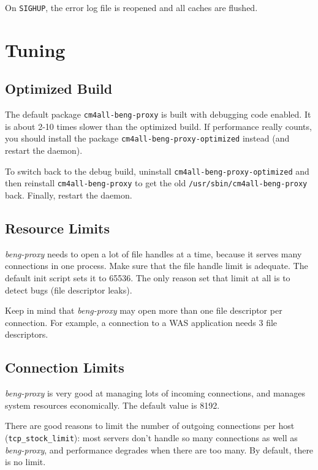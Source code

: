 \documentclass[a4paper,12pt]{article}
\begin{document}
On \texttt{SIGHUP}, the error log file is reopened and all caches are
flushed.


\section{Tuning}

\subsection{Optimized Build}

The default package \texttt{cm4all-beng-proxy} is built with debugging
code enabled.  It is about 2-10 times slower than the optimized build.
If performance really counts, you should install the package
\texttt{cm4all\--beng\--proxy\--optimized} instead (and restart the
daemon).

To switch back to the debug build, uninstall
\texttt{cm4all\--beng\--proxy\--op\-ti\-mi\-zed} and then reinstall
\texttt{cm4all\--beng\--proxy} to get the old
\texttt{/usr/sbin/cm4all\--beng\--proxy} back.  Finally, restart the
daemon.

\subsection{Resource Limits}

\emph{beng-proxy} needs to open a lot of file handles at a time,
because it serves many connections in one process.  Make sure that the
file handle limit is adequate.  The default init script sets it to
65536.  The only reason set that limit at all is to detect bugs (file
descriptor leaks).

Keep in mind that \emph{beng-proxy} may open more than one file
descriptor per connection.  For example, a connection to a WAS
application needs 3 file descriptors.

\subsection{Connection Limits}

\emph{beng-proxy} is very good at managing lots of incoming
connections, and manages system resources economically.  The default
value is 8192.

There are good reasons to limit the number of outgoing connections per
host (\verb|tcp_stock_limit|): most servers don't handle so many
connections as well as \emph{beng-proxy}, and performance degrades
when there are too many.  By default, there is no limit.
\end{document}
